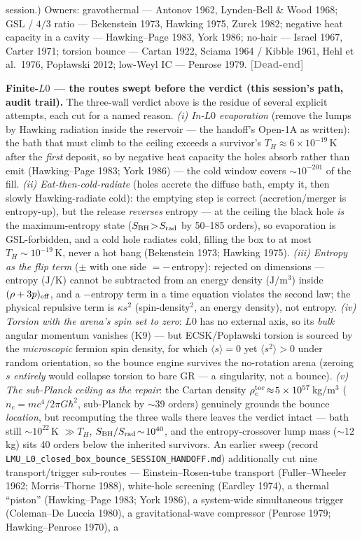 \documentclass[11pt]{article}
\newcommand{\dead}{\textcolor{gray}{\textbf{[Dead-end]}}}
\begin{document}
session.) Owners: gravothermal --- Antonov 1962, Lynden-Bell \& Wood 1968; GSL / $4/3$ ratio --- Bekenstein 1973, Hawking 1975, Zurek 1982; negative heat capacity in a cavity --- Hawking--Page 1983, York 1986; no-hair --- Israel 1967, Carter 1971; torsion bounce --- Cartan 1922, Sciama 1964 / Kibble 1961, Hehl et al.\ 1976, Pop\l{}awski 2012; low-Weyl IC --- Penrose 1979. \dead\quad

\textbf{Finite-$L0$ --- the routes swept before the verdict (this session's path, audit trail).} The three-wall verdict above is the residue of several explicit attempts, each cut for a named reason. \emph{(i) In-$L0$ evaporation} (remove the lumps by Hawking radiation inside the reservoir --- the handoff's Open-1A as written): the bath that must climb to the ceiling exceeds a survivor's $T_H\!\approx\!6\times10^{-19}$\,K after the \emph{first} deposit, so by negative heat capacity the holes absorb rather than emit (Hawking--Page 1983; York 1986) --- the cold window covers $\sim\!10^{-201}$ of the fill. \emph{(ii) Eat-then-cold-radiate} (holes accrete the diffuse bath, empty it, then slowly Hawking-radiate cold): the emptying step is correct (accretion/merger is entropy-up), but the release \emph{reverses} entropy --- at the ceiling the black hole \emph{is} the maximum-entropy state ($S_{\rm BH}\!>\!S_{\rm rad}$ by 50--185 orders), so evaporation is GSL-forbidden, and a cold hole radiates cold, filling the box to at most $T_H\!\sim\!10^{-19}$\,K, never a hot bang (Bekenstein 1973; Hawking 1975). \emph{(iii) Entropy as the flip term} ($\pm$ with one side $=-$\,entropy): rejected on dimensions --- entropy ($\mathrm{J/K}$) cannot be subtracted from an energy density ($\mathrm{J/m^3}$) inside $(\rho+3p)_{\rm eff}$, and a $-$entropy term in a time equation violates the second law; the physical repulsive term is $\kappa s^2$ (spin-density$^2$, an energy density), not entropy. \emph{(iv) Torsion with the arena's spin set to zero}: $L0$ has no external axis, so its \emph{bulk} angular momentum vanishes (K9) --- but ECSK/Popławski torsion is sourced by the \emph{microscopic} fermion spin density, for which $\langle s\rangle\!=\!0$ yet $\langle s^2\rangle\!>\!0$ under random orientation, so the bounce engine survives the no-rotation arena (zeroing $s$ \emph{entirely} would collapse torsion to bare GR --- a singularity, not a bounce). \emph{(v) The sub-Planck ceiling as the repair}: the Cartan density $\rho_c^{\rm tor}\!\approx\!5\times10^{57}$\,kg/m$^3$ ($n_c\!=\!mc^4/2\pi G\hbar^2$, sub-Planck by $\sim$39 orders) genuinely grounds the bounce \emph{location}, but recomputing the three walls there leaves the verdict intact --- bath still $\sim\!10^{22}$\,K $\gg\!T_H$, $S_{\rm BH}/S_{\rm rad}\!\sim\!10^{40}$, and the entropy-crossover lump mass ($\sim$12\,kg) sits 40 orders below the inherited survivors. An earlier sweep (record \texttt{LMU\_L0\_closed\_box\_bounce\_SESSION\_HANDOFF.md}) additionally cut nine transport/trigger sub-routes --- Einstein--Rosen-tube transport (Fuller--Wheeler 1962; Morris--Thorne 1988), white-hole screening (Eardley 1974), a thermal ``piston'' (Hawking--Page 1983; York 1986), a system-wide simultaneous trigger (Coleman--De Luccia 1980), a gravitational-wave compressor (Penrose 1979; Hawking--Penrose 1970), a 
\end{document}
